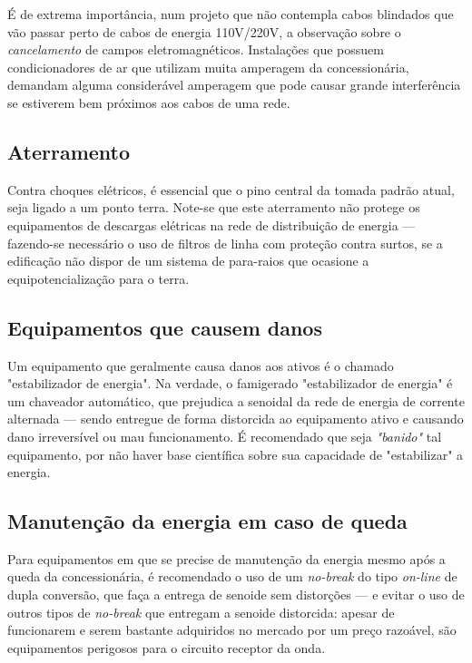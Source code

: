 \documentclass[	DIV=calc,%
							paper=a4,%
							fontsize=12pt,%
							onecolumn]{scrartcl}	 					%
\begin{document}
É de extrema importância, num projeto que não contempla cabos blindados  que vão passar perto de cabos de energia 110V/220V, a observação sobre o \textit{cancelamento} de campos eletromagnéticos. Instalações que possuem condicionadores de ar que utilizam muita amperagem da concessionária, demandam alguma considerável amperagem que pode causar grande interferência se estiverem bem próximos aos cabos de uma rede.  
\\

\subsection{Aterramento}

Contra choques elétricos, é essencial que o pino central da tomada padrão atual, seja ligado a um ponto terra. Note-se que este aterramento não protege os equipamentos de descargas elétricas na rede de distribuição de energia --- fazendo-se necessário o uso de filtros de linha com proteção contra surtos, se a edificação não dispor de um sistema de para-raios que ocasione a equipotencialização para o terra.

\subsection{Equipamentos que causem danos}

Um equipamento que geralmente causa danos aos ativos é o chamado "estabilizador de energia". Na verdade, o famigerado "estabilizador de energia" é um chaveador automático, que prejudica a senoidal da rede de energia de corrente alternada --- sendo entregue de forma distorcida ao equipamento ativo e causando dano irreversível ou mau funcionamento. É recomendado que seja \textit{"banido"} tal equipamento, por não haver base científica sobre sua capacidade de "estabilizar" a energia.

\subsection{Manutenção da energia em caso de queda}

Para equipamentos em que se precise de manutenção da energia mesmo após a queda da concessionária, é recomendado o uso de um \textit{no-break} do tipo \textit{on-line} de dupla conversão, que faça a entrega de senoide sem distorções --- e evitar o uso de outros tipos de \textit{no-break} que entregam a senoide distorcida: apesar de funcionarem e serem bastante adquiridos no mercado por um preço razoável, são equipamentos perigosos para o circuito receptor da onda.
\end{document}
